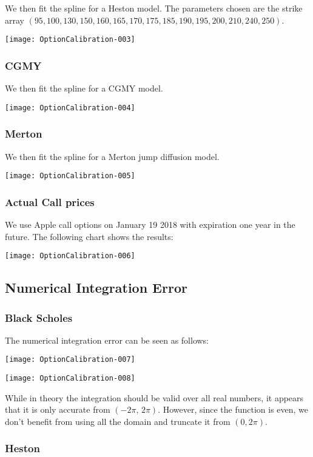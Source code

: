 \documentclass{article}
\begin{document}
We then fit the spline for a Heston model.  The parameters chosen are the strike array \((95,100,130,150,160,165,170,175,185,190,195,200,210,240,250)\).

\texttt{[image: OptionCalibration-003]}


\subsubsection{CGMY}

We then fit the spline for a CGMY model.

\texttt{[image: OptionCalibration-004]}

\subsubsection{Merton}

We then fit the spline for a Merton jump diffusion model.

\texttt{[image: OptionCalibration-005]}

\subsubsection{Actual Call prices}

We use Apple call options on January 19 2018 with expiration one year in the future.  The following chart shows the results:

\texttt{[image: OptionCalibration-006]}

\subsection{Numerical Integration Error}

\subsubsection{Black Scholes}
The numerical integration error can be seen as follows:

\texttt{[image: OptionCalibration-007]}

\texttt{[image: OptionCalibration-008]}




While in theory the integration should be valid over all real numbers, it appears that it is only accurate from \((-2\pi,\,2\pi)\).  However, since the function is even, we don't benefit from using all the domain and truncate it from \((0, 2 \pi)\).

\subsubsection{Heston}
\end{document}
